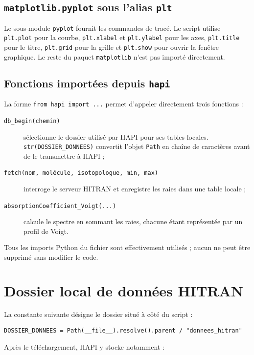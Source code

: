 \documentclass[11pt,a4paper]{article}
\newcommand{\code}[1]{\texttt{#1}}
\begin{document}
\subsection{\code{matplotlib.pyplot} sous l'alias \code{plt}}

Le sous-module \code{pyplot} fournit les commandes de tracé. Le script utilise
\code{plt.plot} pour la courbe, \code{plt.xlabel} et \code{plt.ylabel} pour les
axes, \code{plt.title} pour le titre, \code{plt.grid} pour la grille et
\code{plt.show} pour ouvrir la fenêtre graphique. Le reste du paquet
\code{matplotlib} n'est pas importé directement.

\subsection{Fonctions importées depuis \code{hapi}}

La forme \code{from hapi import ...} permet d'appeler directement trois
fonctions :

\begin{description}
  \item[\code{db\_begin(chemin)}] sélectionne le dossier utilisé par HAPI pour
        ses tables locales. \code{str(DOSSIER\_DONNEES)} convertit l'objet
        \code{Path} en chaîne de caractères avant de le transmettre à HAPI ;
  \item[\code{fetch(nom, molécule, isotopologue, min, max)}] interroge le
        serveur HITRAN et enregistre les raies dans une table locale ;
  \item[\code{absorptionCoefficient\_Voigt(...)}] calcule le spectre en
        sommant les raies, chacune étant représentée par un profil de Voigt.
\end{description}

Tous les imports Python du fichier sont effectivement utilisés ; aucun ne peut
être supprimé sans modifier le code.

\section{Dossier local de données HITRAN}

La constante suivante désigne le dossier situé à côté du script :

\begin{lstlisting}
DOSSIER_DONNEES = Path(__file__).resolve().parent / "donnees_hitran"
\end{lstlisting}

Après le téléchargement, HAPI y stocke notamment :
\end{document}
